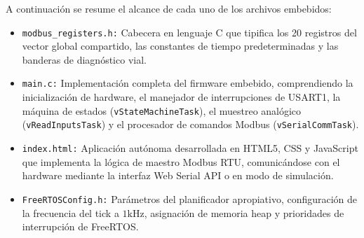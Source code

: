 A continuación se resume el alcance de cada uno de los archivos embebidos:
\begin{itemize}
  \item \texttt{modbus\_registers.h:} Cabecera en lenguaje C que tipifica los 20 registros del vector global compartido,
  las constantes de tiempo predeterminadas y las banderas de diagnóstico vial.
  \item \texttt{main.c:} Implementación completa del firmware embebido, comprendiendo la inicialización de hardware, el
  manejador de interrupciones de USART1, la máquina de estados (\texttt{vStateMachineTask}), el muestreo analógico
  (\texttt{vReadInputsTask}) y el procesador de comandos Modbus (\texttt{vSerialCommTask}).
  \item \texttt{index.html:} Aplicación autónoma desarrollada en HTML5, CSS y JavaScript que implementa la lógica de
  maestro Modbus RTU, comunicándose con el hardware mediante la interfaz Web Serial API o en modo de simulación.
  \item \texttt{FreeRTOSConfig.h:} Parámetros del planificador apropiativo, configuración de la frecuencia del tick a
  $1\unit{\kilo\hertz}$, asignación de memoria heap y prioridades de interrupción de FreeRTOS.
\end{itemize}
